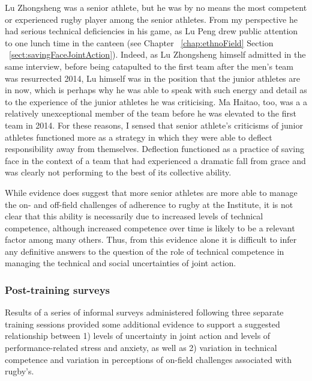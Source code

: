 \begin{CJK}{UTF8}{gbsn}
Lu Zhongsheng was a senior athlete, but he was by no means the most competent or experienced rugby player among the senior athletes.  From my perspective he had serious technical deficiencies in his game, as Lu Peng drew public attention to one lunch time in the canteen (see Chapter ~\ref{chap:ethnoField} Section ~\ref{sect:savingFaceJointAction}).  Indeed, as Lu Zhongsheng himself admitted in the same interview, before being catapulted to the first team after the men's team was resurrected 2014, Lu himself was in the position that the junior athletes are in now, which is perhaps why he was able to speak with such energy and detail as to the experience of the junior athletes he was criticising.  Ma Haitao, too, was a a relatively unexceptional member of the team before he was elevated to the first team in 2014.  For these reasons, I sensed that senior athlete's criticisms of junior athletes functioned more as a strategy in which they were able to deflect responsibility away from themselves.  Deflection functioned as a practice of saving face in the context of a team that had experienced a dramatic fall from grace and was clearly not performing to the best of its collective ability.

While evidence does suggest that more senior athletes are more able to manage the on- and off-field challenges of adherence to rugby at the Institute, it is not clear that this ability is necessarily due to increased levels of technical competence, although increased competence over time is likely to be a relevant factor among many others.  Thus, from this evidence alone it is difficult to infer any definitive answers to the question of the role of technical competence in managing the technical and social uncertainties of joint action.












\subsubsection{Post-training surveys}

Results of a series of informal surveys administered following three separate training sessions provided some additional evidence to support a suggested relationship between 1) levels of uncertainty in joint action and levels of performance-related stress and anxiety, as well as 2) variation in technical competence and variation in perceptions of on-field challenges associated with rugby’s.


\end{CJK}
